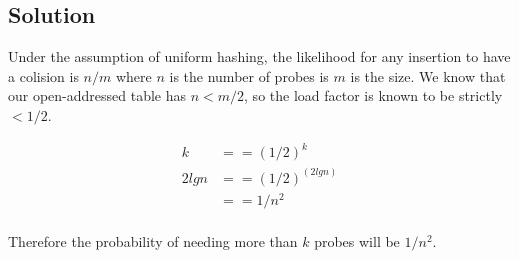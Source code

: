 \subsection*{Solution}

Under the assumption of uniform hashing, the likelihood for any insertion to have a colision is $n/m$ where $n$ is the number of probes is $m$ is the size. We know that our open-addressed table has $n < m/2$, so the load factor is known to be strictly $< 1/2$.

\begin{align*}
     k &== (1/2)^k \\
2 lg n &== (1/2)^{(2 lg n)} \\
       &== 1/n^2 \\
\end{align*}

Therefore the probability of needing more than $k$ probes will be $1/n^2$.
